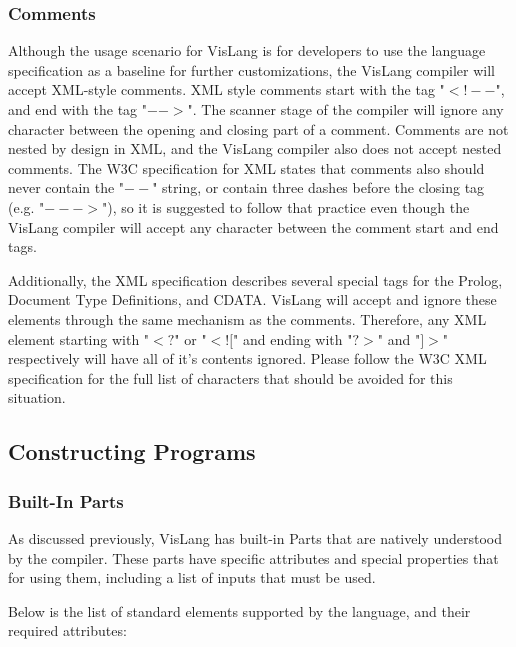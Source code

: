 \subsubsection{Comments}
Although the usage scenario for VisLang is for developers to use the language specification as a baseline for further customizations, the VisLang compiler will accept XML-style comments.
XML style comments start with the tag "$<!--$", and end with the tag "$-->$".
The scanner stage of the compiler will ignore any character between the opening and closing part of a comment.
Comments are not nested by design in XML, and the VisLang compiler also does not accept nested comments.
The W3C specification for XML states that comments also should never contain the "$--$" string, or contain three dashes before the closing tag (e.g. "$--->$"), so it is suggested to follow that practice even though the VisLang compiler will accept any character between the comment start and end tags.
\par
Additionally, the XML specification describes several special tags for the Prolog, Document Type Definitions, and CDATA.
VisLang will accept and ignore these elements through the same mechanism as the comments.
Therefore, any XML element starting with "$<?$" or "$<![$" and ending with "$?>$" and "$]>$" respectively will have all of it's contents ignored.
Please follow the W3C XML specification for the full list of characters that should be avoided for this situation.
\subsection{Constructing Programs}
\subsubsection{Built-In Parts}
As discussed previously, VisLang has built-in Parts that are natively understood by the compiler.
These parts have specific attributes and special properties that for using them, including a list of inputs that must be used.
\par
Below is the list of standard elements supported by the language, and their required attributes:

